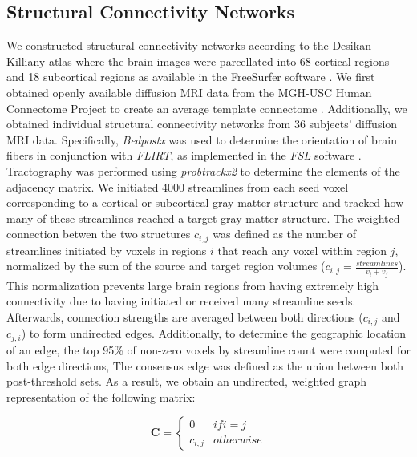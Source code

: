 \documentclass{article}
\begin{document}
\subsection{Structural Connectivity Networks} We constructed structural connectivity networks according to the Desikan-Killiany atlas where the brain images were parcellated into 68 cortical regions and 18 subcortical regions as available in the FreeSurfer software \cite{Fischl2002, Desikan2006}. We first obtained openly available diffusion MRI data from the MGH-USC Human Connectome Project to create an average template connectome \cite{McNab2013}. Additionally, we obtained individual structural connectivity networks from 36 subjects' diffusion MRI data. Specifically, \textit{Bedpostx} was used to determine the orientation of brain fibers in conjunction with \textit{FLIRT}, as implemented in the \textit{FSL} software \cite{Jenkinson2012}. Tractography was performed using \textit{probtrackx2} to determine the elements of the adjacency matrix. We initiated 4000 streamlines from each seed voxel corresponding to a cortical or subcortical gray matter structure and tracked how many of these streamlines reached a target gray matter structure. The weighted connection betwen the two structures $c_{i,j}$ was defined as the number of streamlines initiated by voxels in regions $i$ that reach any voxel within region $j$, normalized by the sum of the source and target region volumes ($c_{i,j} = \frac{streamlines}{v_i + v_j}$). This normalization prevents large brain regions from having extremely high connectivity due to having initiated or received many streamline seeds. Afterwards, connection strengths are averaged between both directions ($c_{i,j}$ and $c_{j,i}$) to form undirected edges. Additionally, to determine the geographic location of an edge, the top 95\% of non-zero voxels by streamline count were computed for both edge directions, The consensus edge was defined as the union between both post-threshold sets. As a result, we obtain an undirected, weighted graph representation of the following matrix:

\[ \mathbf{C} = \begin{cases}
    0 & if i = j\\
    c_{i,j} & otherwise
    \end{cases}
    \]
\end{document}

